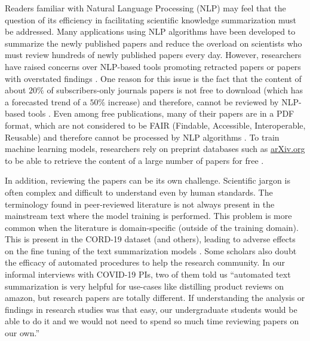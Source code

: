 \documentclass[acmsmall,authordraft]{acmart}
\begin{document}
Readers familiar with Natural Language Processing (NLP) may feel that the question of its efficiency in facilitating scientific knowledge summarization must be addressed. Many applications using NLP algorithms have been developed to summarize the newly published papers and reduce the overload on scientists who must review hundreds of newly published papers every day. However, researchers have raised concerns over NLP-based tools promoting retracted papers or papers with overstated findings \citep{Brainard2020drowning}. One reason for this issue is the fact that the content of about $20\%$ of subscribers-only journals papers is not free to download (which has a forecasted trend of a $50\%$ increase) and therefore, cannot be reviewed by NLP-based tools \citep{Brainard2020drowning}. Even among  free publications, many of their papers are in a PDF format, which are not considered to be FAIR (Findable, Accessible, Interoperable, Reusable) and therefore cannot be processed by NLP algorithms \citep{oelen2020generate}. To train machine learning models, researchers rely on preprint databases such as \url{arXiv.org} to be able to retrieve the content of a large number of papers for free \citep{Brainard2020drowning}.

In addition, reviewing the papers can be its own challenge. Scientific jargon is often complex and difficult to understand even by human standards. The terminology found in peer-reviewed literature is not always present in the mainstream text where the model training is performed. This problem is more common when the literature is domain-specific (outside of the training domain). This is present in the CORD-19 dataset (and others), leading to adverse effects on the fine tuning of the text summarization models \citep{kieuvongngam2020automatic}. Some scholars also doubt the efficacy of automated procedures to help the research community. In our informal interviews with COVID-19 PIs, two of them told us ``automated text summarization is very helpful for use-cases like distilling product reviews on amazon, but research papers are totally different. If understanding the analysis or findings in research studies was that easy, our undergraduate students would be able to do it and we would not need to spend so much time reviewing papers on our own.''
\end{document}
